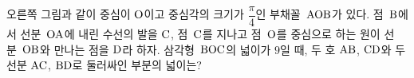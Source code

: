\noindent\begin{minipage}[t]{0.58\linewidth}\vspace{0pt}\raggedright 오른쪽 그림과 같이 중심이 $\mathrm{O}$이고 중심각의 크기가 $\dfrac{\pi}{4}$인 부채꼴~$\mathrm{AOB}$가 있다. 점~$\mathrm{B}$에서 선분~$\mathrm{OA}$에 내린 수선의 발을 $\mathrm{C}$, 점~$\mathrm{C}$를 지나고 점~$\mathrm{O}$를 중심으로 하는 원이 선분~$\mathrm{OB}$와 만나는 점을 $\mathrm{D}$라 하자. 삼각형~$\mathrm{BOC}$의 넓이가 $9$일 때, 두 호 $\mathrm{AB}$, $\mathrm{CD}$와 두 선분 $\mathrm{AC}$, $\mathrm{BD}$로 둘러싸인 부분의 넓이는?\end{minipage}\hfill\begin{minipage}[t]{0.4\linewidth}\vspace{0pt}\centering \resizebox{\ifdim\width>\linewidth\linewidth\else\width\fi}{!}{}\end{minipage}\par
{}
